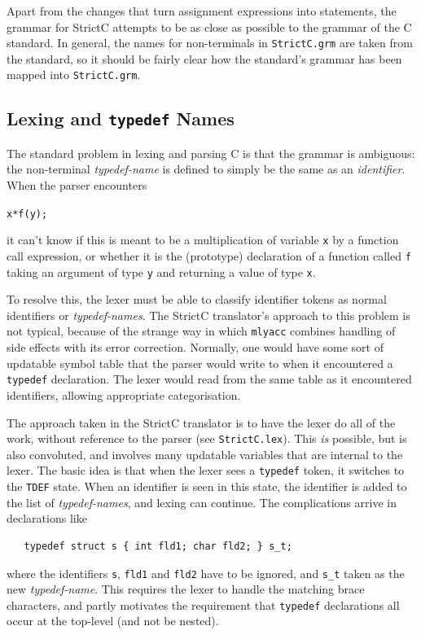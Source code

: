 \documentclass{article}
\newcommand{\strictc}{\textsf{StrictC}}
\newcommand{\srcfile}[1]{\texttt{#1}}
\begin{document}
Apart from the changes that turn assignment expressions into
statements, the grammar for \strictc{} attempts to be as close as
possible to the grammar of the C standard.  In general, the names for
non-terminals in \srcfile{StrictC.grm} are taken from the standard, so it
should be fairly clear how the standard's grammar has been mapped into
\srcfile{StrictC.grm}.

\subsection{Lexing and \texttt{typedef} Names}
\label{sec:lexing-typedefs}

The standard problem in lexing and parsing C is that the grammar is
ambiguous: the non-terminal \textit{typedef-name} is defined to simply
be the same as an \textit{identifier}.  When the parser encounters
\begin{alltt}
   x * f(y);
\end{alltt}
it can't know if this is meant to be a multiplication of variable
\texttt{x} by a function call expression, or whether it is the
(prototype) declaration of a function called \texttt{f} taking an
argument of type \texttt{y} and returning a value of type \texttt{x}.

To resolve this, the lexer must be able to classify identifier tokens as
normal identifiers or \textit{typedef-names}.  The \strictc{}
translator's approach to this problem is not typical, because of the
strange way in which \texttt{mlyacc} combines handling of side effects
with its error correction.  Normally, one would have some sort of
updatable symbol table that the parser would write to when it
encountered a \texttt{typedef} declaration.  The lexer would read from
the same table as it encountered identifiers, allowing appropriate
categorisation.

The approach taken in the \strictc{} translator is to have the lexer do
all of the work, without reference to the parser (see
\srcfile{StrictC.lex}).  This \emph{is} possible, but is also convoluted,
and involves many updatable variables that are internal to the lexer.
The basic idea is that when the lexer sees a \texttt{typedef} token,
it switches to the \texttt{TDEF} state.  When an identifier is seen in
this state, the identifier is added to the list of
\textit{typedef-names}, and lexing can continue.  The complications
arrive in declarations like
\begin{verbatim}
   typedef struct s { int fld1; char fld2; } s_t;
\end{verbatim}
where the identifiers \texttt{s}, \texttt{fld1} and \texttt{fld2} have
to be ignored, and \texttt{s_t} taken as the new \emph{typedef-name}.
This requires the lexer to handle the matching brace characters, and
partly motivates the requirement that \texttt{typedef} declarations
all occur at the top-level (and not be nested).
\end{document}
